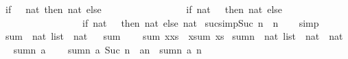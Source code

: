 \begin{isabellebody}
\ {\isachardoublequoteopen}if\ {}{}{}\ {\isacharless}\ {\isacharparenleft}{}{}{}{\isacharcolon}{\isacharcolon}nat{\isacharparenright}\ then\ {\isacharparenleft}{}{\isacharcolon}{\isacharcolon}nat{\isacharparenright}\ else\ \isanewline
\ \ \ \ \ \ \ \ \ \ \ \ \ \ \ \ {\isacharparenleft}if\ {\isacharparenleft}{}{}{}{\isacharcolon}{\isacharcolon}nat{\isacharparenright}\ {\isacharless}\ {}{}{}{}\ then\ {\isacharparenleft}{}{\isacharcolon}{\isacharcolon}nat{\isacharparenright}\ else\isanewline
\ \ \ \ \ \ \ \ \ \ \ \ \ \ \ \ \ {\isacharparenleft}if\ {\isacharparenleft}{}{}{}{\isacharcolon}{\isacharcolon}nat{\isacharparenright}\ {\isacharless}\ {}{}{}{}{}{}\ then\ {\isacharparenleft}{}{}{\isacharcolon}{\isacharcolon}nat{\isacharparenright}\ else\ {\isacharparenleft}{}{}{\isacharcolon}{\isacharcolon}nat{\isacharparenright}{\isacharparenright}{\isacharparenright}{\isachardoublequoteclose}\isanewline
\isanewline
{}\isamarkupfalse%
\ suc{\isacharunderscore}simp{\isacharcolon}{\isachardoublequoteopen}Suc\ n\ {\isacharequal}\ n{\isacharplus}{}{\isachardoublequoteclose}\isanewline
%
\isadelimproof
\ \ %
\endisadelimproof
%
\isatagproof
{}\isamarkupfalse%
\ simp%
\endisatagproof
{\isafoldproof}%
%
\isadelimproof
\isanewline
%
\endisadelimproof
\isanewline
{}\isamarkupfalse%
\ sum\ {\isacharcolon}{\isacharcolon}\ {\isachardoublequoteopen}nat\ list\ {\isasymRightarrow}\ nat{\isachardoublequoteclose}\isanewline
\ \ \isanewline
{\isachardoublequoteopen}sum\ {\isacharbrackleft}{\isacharbrackright}\ {\isacharequal}\ {}{\isachardoublequoteclose}\ {\isacharbar}\isanewline
{\isachardoublequoteopen}sum\ {\isacharparenleft}x{\isacharhash}xs{\isacharparenright}\ {\isacharequal}\ x{\isacharplus}{\isacharparenleft}sum\ xs{\isacharparenright}{\isachardoublequoteclose}\isanewline
\isanewline
{}\isamarkupfalse%
\ sumn\ {\isacharcolon}{\isacharcolon}\ {\isachardoublequoteopen}nat\ list\ {\isasymRightarrow}\ nat\ {\isasymRightarrow}\ nat{\isachardoublequoteclose}\isanewline
\ \ \isanewline
{\isachardoublequoteopen}sumn\ a\ {}\ {\isacharequal}\ {}{\isachardoublequoteclose}\ {\isacharbar}\isanewline
{\isachardoublequoteopen}sumn\ a\ {\isacharparenleft}Suc\ n{\isacharparenright}\ {\isacharequal}\ a{\isacharbang}n\ {\isacharplus}\ {\isacharparenleft}sumn\ a\ n{\isacharparenright}{\isachardoublequoteclose}\isanewline

\end{isabellebody}
